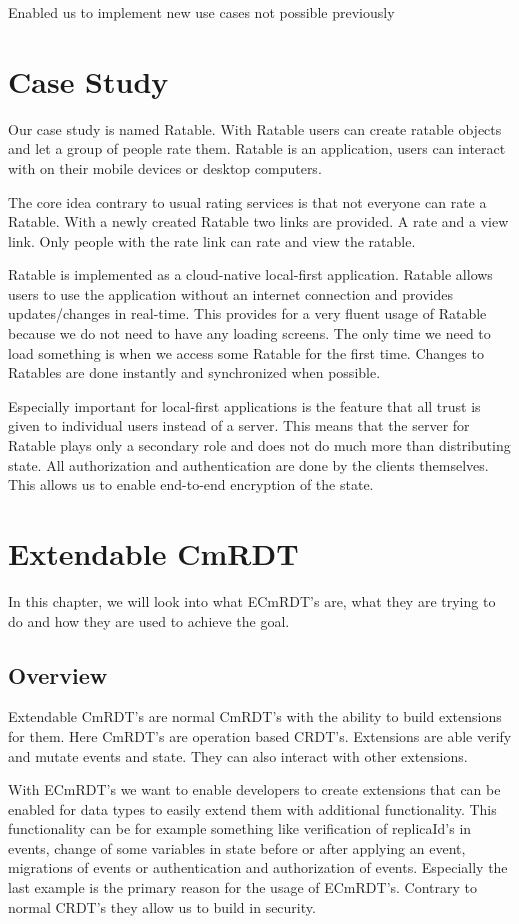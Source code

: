 \documentclass[
	ngerman,
	ruledheaders=section,   %
	class=report,		    %
	thesis={type=bachelor}, %
	accentcolor=9c,			%
	custommargins=true,    %
	marginpar=false,        %
	parskip=half-,          %
	fontsize=11pt,          %
]{tudapub}
\begin{document}
Enabled us to implement new use cases not possible previously

\chapter{Case Study}
Our case study is named Ratable. With Ratable users can create ratable objects and let a group of people rate them. Ratable is an application, users can interact with on their mobile devices or desktop computers. 

The core idea contrary to usual rating services is that not everyone can rate a Ratable. With a newly created Ratable two links are provided. A rate and a view link. Only people with the rate link can rate and view the ratable.

Ratable is implemented as a cloud-native local-first application. Ratable allows users to use the application without an internet connection and provides updates/changes in real-time. This provides for a very fluent usage of Ratable because we do not need to have any loading screens. The only time we need to load something is when we access some Ratable for the first time. Changes to Ratables are done instantly and synchronized when possible.

Especially important for local-first applications is the feature that all trust is given to individual users instead of a server. This means that the server for Ratable plays only a secondary role and does not do much more than distributing state. All authorization and authentication are done by the clients themselves. This allows us to enable end-to-end encryption of the state.

\chapter{Extendable CmRDT}
In this chapter, we will look into what ECmRDT's are, what they are trying to do and how they are used to achieve the goal.

\section{Overview}
Extendable CmRDT's are normal CmRDT's with the ability to build extensions for them. Here CmRDT's are operation based CRDT's. Extensions are able verify and mutate events and state. They can also interact with other extensions. 

With ECmRDT's we want to enable developers to create extensions that can be enabled for data types to easily extend them with additional functionality. This functionality can be for example something like verification of replicaId's in events, change of some variables in state before or after applying an event, migrations of events or authentication and authorization of events. Especially the last example is the primary reason for the usage of ECmRDT's. Contrary to normal CRDT's they allow us to build in security.
\end{document}
